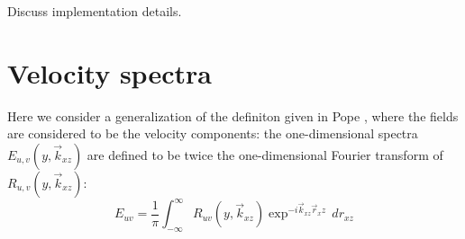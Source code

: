 \documentclass[letterpaper,11pt,nointlimits,reqno]{amsart}
\begin{document}
Discuss implementation details.


\section{Velocity spectra
         \citep[\textsection{}6.5]{Pope2000Turbulent}}

Here we consider a generalization of the definiton given in Pope
\citep[\textsection{}6.3]{Pope2000Turbulent}, where the fields are considered to
be the velocity components: the one-dimensional spectra 
$E_{u,v}(y,\vec{k}_{xz})$ are defined to be twice the one-dimensional Fourier
transform of $R_{u,v}(y,\vec{k}_{xz})$:
%
\begin{equation}
E_{uv} = \frac{1}{\pi} \int_{-\infty}^{\infty} R_{uv}(y,\vec{k}_{xz}) 
         \exp^{-i \vec{k}_{xz} \vec{r}_xz} \,d\!r_{xz}
\end{equation}
%


\newcommand*{\doi}[1]{\href{http://dx.doi.org/\detokenize{#1}}{doi: #1}}


\end{document}
